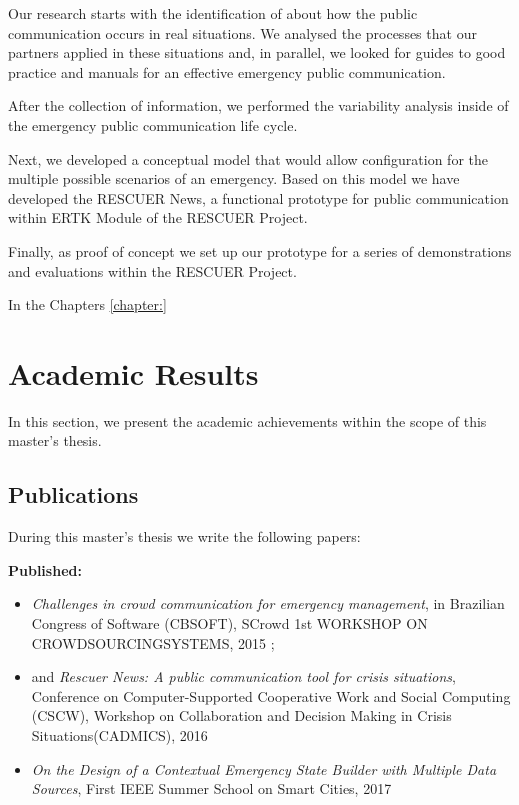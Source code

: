 Our research starts with the identification of about how the public communication occurs in real situations. We analysed the processes that our partners applied in these situations and, in parallel, we looked for guides to good practice and manuals for an effective emergency public communication.

After the collection of information, we performed the variability analysis inside of the emergency public communication life cycle.

Next, we developed a conceptual model that would allow configuration for the multiple possible scenarios of an emergency. Based on this model we have developed the RESCUER News, a functional prototype for public communication within ERTK Module of the RESCUER Project.

Finally, as proof of concept we set up our prototype for a series of demonstrations and evaluations within the RESCUER Project.

In the Chapters \ref{chapter:}

\section{Academic Results}

In this section, we present the academic achievements within the scope of this master's thesis.

\subsection{Publications}

During this master's thesis we write the following papers: 

\textbf{Published:}

\begin{itemize}
   \item \emph{Challenges in crowd communication for emergency management}, in Brazilian Congress of Software (CBSOFT), SCrowd 1st WORKSHOP ON CROWDSOURCINGSYSTEMS, 2015 \cite{pereirachallenges};
   
   \item and \emph{Rescuer News: A public communication tool for crisis situations}, Conference on Computer-Supported Cooperative Work and Social Computing (CSCW), Workshop  on  Collaboration  and  Decision  Making  in  Crisis  Situations(CADMICS), 2016 \cite{cscw2016}
  
   \item \emph{On the Design of a Contextual Emergency State Builder with Multiple Data Sources}, First IEEE Summer School on Smart Cities, 2017 \cite{pereiraetall2017}
  
\end{itemize}

